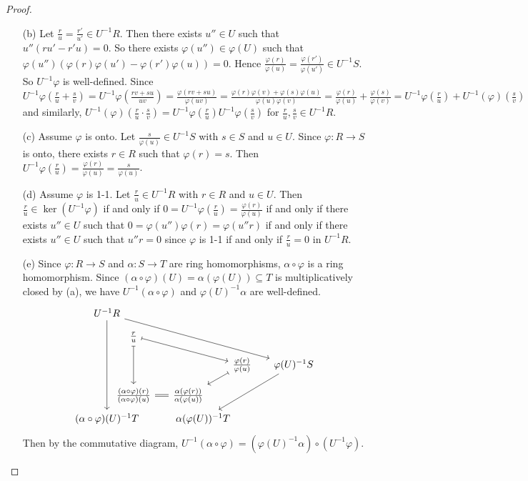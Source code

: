 \begin{proof}
    \begin{enumerate}
        \item [(b)] 
            Let $\frac{r}{u} = \frac{r'}{u'} \in U^{-1}R$. Then there exists $u'' \in U$ such that $u''(ru'-r'u) = 0$. So there exists $\varphi(u'') \in \varphi(U)$ such that $\varphi(u'')(\varphi(r)\varphi(u') - \varphi(r')\varphi(u)) = 0$. Hence $\frac{\varphi(r)}{\varphi(u)} = \frac{\varphi(r')}{\varphi(u')} \in U^{-1}S$. So $U^{-1}\varphi$ is well-defined. Since $U^{-1}\varphi(\frac{r}{u} + \frac{s}{v}) = U^{-1}\varphi(\frac{rv+su}{uv}) = \frac{\varphi(rv+su)}{\varphi(uv)} = \frac{\varphi(r)\varphi(v)+\varphi(s)\varphi(u)}{\varphi(u)\varphi(v)} = \frac{\varphi(r)}{\varphi(u)}+\frac{\varphi(s)}{\varphi(v)} = U^{-1}\varphi(\frac{r}{u})+U^{-1}(\varphi)(\frac{s}{v})$ and similarly, $U^{-1}(\varphi)(\frac{r}{u} \cdot\frac{s}{v}) = U^{-1}\varphi(\frac{r}{u})U^{-1}\varphi(\frac{s}{v})$ for $\frac{r}{u},\frac{s}{v} \in U^{-1}R$. 
        \item [(c)]
            Assume $\varphi$ is onto. Let $\frac{s}{\varphi(u)} \in U^{-1}S$ with $s \in S$ and $u \in U$. Since $\varphi: R \to S$ is onto, there exists $r \in R$ such that $\varphi(r) = s$. Then $U^{-1}\varphi(\frac{r}{u}) = \frac{\varphi(r)}{\varphi(u)} = \frac{s}{\varphi(u)}$. 
        \item[(d)] Assume $\varphi$ is 1-1. Let $\frac{r}{u} \in U^{-1}R$ with $r \in R$ and $u \in U$. Then $\frac{r}{u} \in \ker(U^{-1}\varphi)$ if and only if $0 = U^{-1}\varphi(\frac{r}{u}) = \frac{\varphi(r)}{\varphi(u)}$ if and only if there exists $u'' \in U$ such that $0 = \varphi(u'')\varphi(r) = \varphi(u''r)$ if and only if there exists $u'' \in U$ such that $u''r = 0$ since $\varphi$ is 1-1 if and only if $\frac{r}{u} = 0$ in $U^{-1}R$. 
        \item[(e)] 
            Since $\varphi:R \to S$ and $\alpha: S \to T$ are ring homomorphisms, $\alpha \circ \varphi$ is a ring homomorphism. Since $(\alpha \circ \varphi)(U) = \alpha(\varphi(U)) \subseteq T$ is multiplicatively closed by (a), we have $U^{-1}(\alpha \circ \varphi)$ and $\varphi(U)^{-1}\alpha$ are well-defined. 
        \[
            \begin{tikzcd}
                U^{-1}R \ar[ddrrrrr] \ar[dddd] &[-55pt] &[-10pt] &[-60pt] &[-30pt] &[-10pt] \\ [-10pt]
                & \frac{r}{u} \ar[rrrd,mapsto] \arrow[dd,mapsto] \\ [-10pt]
                & & & & \frac{\varphi(r)}{\varphi(u)} \arrow[lld,mapsto] & \varphi(U)^{-1}S \ar[lldd] \\ [-10pt]
                & \frac{(\alpha \circ \varphi)(r)}{(\alpha \circ \varphi)(u)} \ar[r,equal] & \frac{\alpha(\varphi(r))}{\alpha(\varphi(u))} \\ [-15pt]
                (\alpha \circ \varphi)(U)^{-1}T & & & \alpha(\varphi(U))^{-1}T 
            \end{tikzcd} 
        \]
        Then by the commutative diagram, $U^{-1}(\alpha \circ \varphi) = (\varphi(U)^{-1}\alpha) \circ (U^{-1}\varphi)$. \qedhere
    \end{enumerate}
\end{proof}

